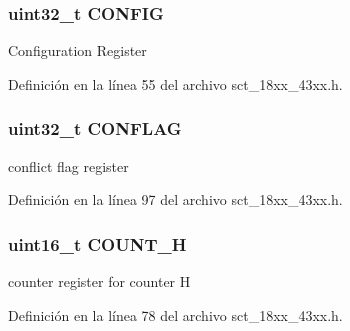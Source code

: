 \subsubsection[{\texorpdfstring{C\+O\+N\+F\+IG}{CONFIG}}]{ uint32\+\_\+t C\+O\+N\+F\+IG}\hypertarget{struct_l_p_c___s_c_t___t_aed40378e2ce292435df51ff247d0cb78}{}\label{struct_l_p_c___s_c_t___t_aed40378e2ce292435df51ff247d0cb78}
Configuration Register 

Definición en la línea 55 del archivo sct\+\_\+18xx\+\_\+43xx.\+h.

\subsubsection[{\texorpdfstring{C\+O\+N\+F\+L\+AG}{CONFLAG}}]{ uint32\+\_\+t C\+O\+N\+F\+L\+AG}\hypertarget{struct_l_p_c___s_c_t___t_aa05f575798ff3629dc2629479f54324d}{}\label{struct_l_p_c___s_c_t___t_aa05f575798ff3629dc2629479f54324d}
conflict flag register 

Definición en la línea 97 del archivo sct\+\_\+18xx\+\_\+43xx.\+h.

\subsubsection[{\texorpdfstring{C\+O\+U\+N\+T\+\_\+H}{COUNT_H}}]{ uint16\+\_\+t C\+O\+U\+N\+T\+\_\+H}\hypertarget{struct_l_p_c___s_c_t___t_a3ad1dafbe735cffe2fa7c03a4481eea7}{}\label{struct_l_p_c___s_c_t___t_a3ad1dafbe735cffe2fa7c03a4481eea7}
counter register for counter H 

Definición en la línea 78 del archivo sct\+\_\+18xx\+\_\+43xx.\+h.

